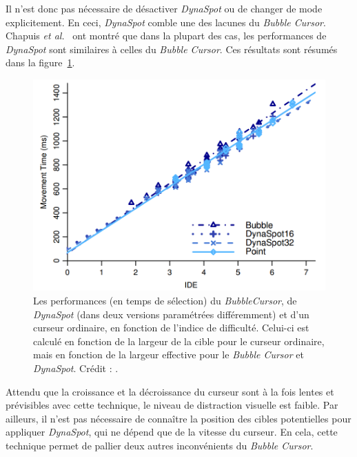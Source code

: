 	Il n'est donc pas nécessaire de désactiver \emph{DynaSpot} ou de changer de mode explicitement. En ceci, \emph{DynaSpot} comble une des lacunes du \emph{Bubble Cursor}. Chapuis \emph{et al.}~\cite{chapuis2009dynaspot} ont montré que dans la plupart des cas, les performances de \emph{DynaSpot} sont similaires à celles du \emph{Bubble Cursor}. Ces résultats sont résumés dans la figure~\ref{fig:dynaResults}.
	 
	\begin{figure}[H]
		\centering
		\includegraphics[width=\textwidth]{figures/ch2/dynaResults}
		\caption{Les performances (en temps de sélection) du \emph{BubbleCursor}, de \emph{DynaSpot} (dans deux versions paramétrées différemment) et d'un curseur ordinaire, en fonction de l'indice de difficulté. Celui-ci est calculé en fonction de la largeur de la cible pour le curseur ordinaire, mais en fonction de la largeur effective pour le \emph{Bubble Cursor} et \emph{DynaSpot}. Crédit : \cite{chapuis2009dynaspot}.}
		\label{fig:dynaResults}
	\end{figure}

	Attendu que la croissance et la décroissance du curseur sont à la fois lentes et prévisibles avec cette technique, le niveau de distraction visuelle est faible. Par ailleurs, il n'est pas nécessaire de connaître la position des cibles potentielles pour appliquer \emph{DynaSpot}, qui ne dépend que de la vitesse du curseur. En cela, cette technique permet de pallier deux autres inconvénients du \emph{Bubble Cursor}.


